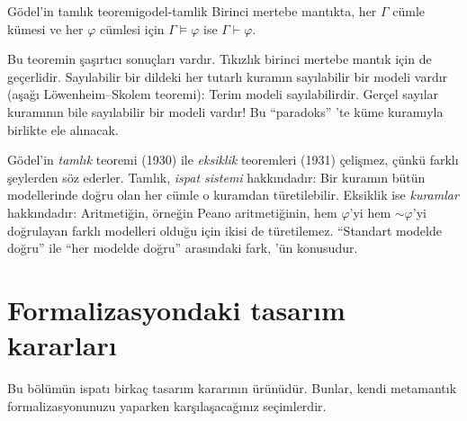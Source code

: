 \begin{teorem}{Gödel'in tamlık teoremi}{godel-tamlik}
Birinci mertebe mantıkta, her $\Gamma$ cümle kümesi ve her $\varphi$
cümlesi için $\Gamma \models \varphi$ ise $\Gamma \vdash \varphi$.
\end{teorem}

\noindent Bu teoremin şaşırtıcı sonuçları vardır. Tıkızlık birinci mertebe
mantık için de geçerlidir. Sayılabilir bir dildeki her tutarlı kuramın
sayılabilir bir modeli vardır (aşağı Löwenheim--Skolem teoremi): Terim
modeli sayılabilirdir. Gerçel sayılar kuramının bile sayılabilir bir
modeli vardır! Bu ``paradoks'' 'te küme kuramıyla birlikte ele
alınacak.

\begin{dikkat}
Gödel'in \emph{tamlık} teoremi (1930) ile \emph{eksiklik} teoremleri
(1931) çelişmez, çünkü farklı şeylerden söz ederler. Tamlık, \emph{ispat
sistemi} hakkındadır: Bir kuramın bütün modellerinde doğru olan her cümle
o kuramdan türetilebilir. Eksiklik ise \emph{kuramlar} hakkındadır:
Aritmetiğin, örneğin Peano aritmetiğinin, hem $\varphi$'yi hem
${\sim}\varphi$'yi doğrulayan farklı modelleri olduğu için ikisi de
türetilemez. ``Standart modelde doğru'' ile ``her modelde doğru''
arasındaki fark, 'ün konusudur.
\end{dikkat}

\section{Formalizasyondaki tasarım kararları}\label{sec:tamlik-tasarim}

Bu bölümün \Lean{} ispatı birkaç tasarım kararının ürünüdür. Bunlar,
kendi metamantık formalizasyonunuzu yaparken karşılaşacağınız
seçimlerdir.

